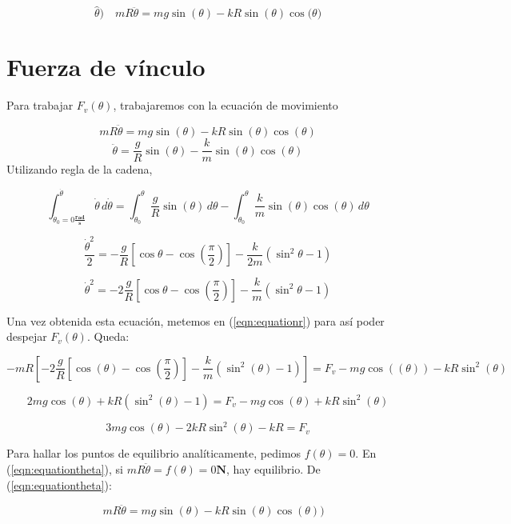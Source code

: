 \documentclass{article}
\begin{document}
    \begin{equation}
    \label{eqn:equationtheta}
    	\hat{\theta}) \quad mR\ddot{\theta} = mg \sin{(\theta)} - kR \sin{(\theta)} \cos{(\theta})
    \end{equation}
    
    \section{Fuerza de v\'inculo}
    
    Para trabajar $F_v(\theta)$, trabajaremos con la ecuaci\'on de movimiento
    
    $$mR\ddot{\theta} = mg \sin{(\theta)} - kR \sin{(\theta)} \cos{(\theta)}$$
    $$\ddot{\theta} = \frac{g}{R} \sin{(\theta)} - \frac{k}{m} \sin{(\theta)} \cos{(\theta)}$$
   	Utilizando regla de la cadena,
   	
   	 $$ \int_{\dot{\theta}_0 = 0 \frac{\textbf{rad}}{\textbf{s}}}^{\dot{\theta}} \! \dot{\theta} \, d\dot{\theta} =
   	 	\int_{\theta_0}^{\theta} \! \frac{g}{R} \sin{(\theta)} \, d\theta -
   	 	\int_{\theta_0}^{\theta} \! \frac{k}{m} \sin{(\theta)} \cos{(\theta)} \, d\theta$$
   	 	
   	 $$ \frac{\dot{\theta}^2}{2} =
   	 	-\frac{g}{R} [ \cos{\theta} - \cos{(\frac{\pi}{2})} ] - \frac{k}{2m}(\sin^2{\theta} - 1) $$
   	 	
   	 $$ \dot{\theta}^2 =
   	 	-2\frac{g}{R} [ \cos{\theta} - \cos{(\frac{\pi}{2})} ] - \frac{k}{m}(\sin^2{\theta} - 1) $$
   	 	
   	 Una vez obtenida esta ecuaci\'on, metemos en (\ref{eqn:equationr}) para as\'i poder despejar $F_v(\theta)$. Queda:
   	 
   	 $$
   	 -mR[-2\frac{g}{R} [ \cos{(\theta)} - \cos{(\frac{\pi}{2})} ] - \frac{k}{m}(\sin^2{(\theta)} - 1)] = F_v - mg \cos{((\theta))} - kR \sin^2{(\theta)}
   	 $$
   	 
   	 $$
   	 	2mg \cos{(\theta)} + kR(\sin^2{(\theta)} - 1) = F_v - mg\cos{(\theta)} + kR\sin^2{(\theta)}
   	 $$
   	 
   	 $$
   		3mg \cos{(\theta)} - 2kR\sin^2{(\theta)} - kR = F_v
   	 $$
   	 
   	 Para hallar los puntos de equilibrio anal\'iticamente, pedimos $f(\theta) = 0$. En (\ref{eqn:equationtheta}), si $mR \ddot{\theta} = f(\theta) = 0 \textbf{N}$, hay equilibrio. De (\ref{eqn:equationtheta}):
   	 
   	 
   	$$
   	\quad mR\ddot{\theta} = mg \sin{(\theta)} - kR \sin{(\theta)} \cos{(\theta)})
   	$$
   	 
\end{document}
